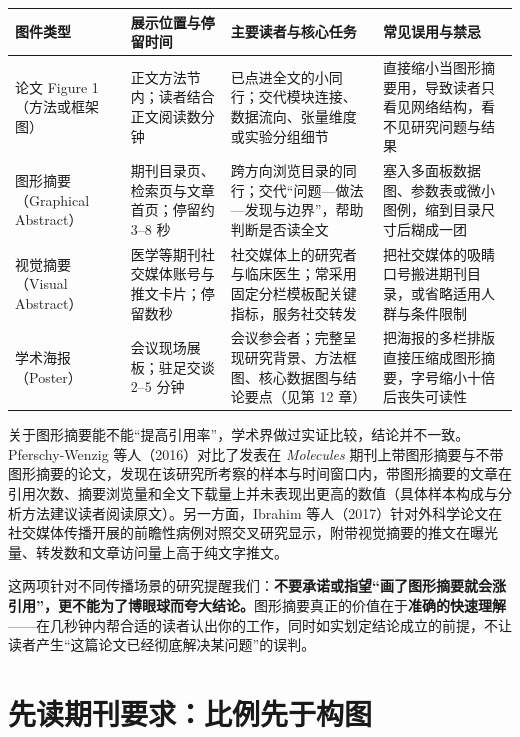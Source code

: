 \begin{center}\footnotesize
\setlength{\tabcolsep}{3pt}
\renewcommand{\arraystretch}{1.15}
\begin{tabularx}{\linewidth}{@{}>{\raggedright\arraybackslash}p{22mm}>{\raggedright\arraybackslash}p{24mm}YY@{}}
\toprule
\textbf{图件类型} & \textbf{展示位置与停留时间} & \textbf{主要读者与核心任务} & \textbf{常见误用与禁忌} \\
\midrule
论文 Figure 1（方法或框架图） & 正文方法节内；读者结合正文阅读数分钟 & 已点进全文的小同行；交代模块连接、数据流向、张量维度或实验分组细节 & 直接缩小当图形摘要用，导致读者只看见网络结构，看不见研究问题与结果 \\
图形摘要（Graphical Abstract） & 期刊目录页、检索页与文章首页；停留约 $3\text{--}8$ 秒 & 跨方向浏览目录的同行；交代“问题—做法—发现与边界”，帮助判断是否读全文 & 塞入多面板数据图、参数表或微小图例，缩到目录尺寸后糊成一团 \\
视觉摘要（Visual Abstract） & 医学等期刊社交媒体账号与推文卡片；停留数秒 & 社交媒体上的研究者与临床医生；常采用固定分栏模板配关键指标，服务社交转发 & 把社交媒体的吸睛口号搬进期刊目录，或省略适用人群与条件限制 \\
学术海报（Poster） & 会议现场展板；驻足交谈 $2\text{--}5$ 分钟 & 会议参会者；完整呈现研究背景、方法框图、核心数据图与结论要点（见第 12 章） & 把海报的多栏排版直接压缩成图形摘要，字号缩小十倍后丧失可读性 \\
\bottomrule
\end{tabularx}
\end{center}

关于图形摘要能不能“提高引用率”，学术界做过实证比较，结论并不一致。Pferschy-Wenzig 等人（2016）对比了发表在 \textit{Molecules} 期刊上带图形摘要与不带图形摘要的论文，发现在该研究所考察的样本与时间窗口内，带图形摘要的文章在引用次数、摘要浏览量和全文下载量上并未表现出更高的数值（具体样本构成与分析方法建议读者阅读原文）。另一方面，Ibrahim 等人（2017）针对外科学论文在社交媒体传播开展的前瞻性病例对照交叉研究显示，附带视觉摘要的推文在曝光量、转发数和文章访问量上高于纯文字推文。

这两项针对不同传播场景的研究提醒我们：\textbf{不要承诺或指望“画了图形摘要就会涨引用”，更不能为了博眼球而夸大结论。}图形摘要真正的价值在于\textbf{准确的快速理解}——在几秒钟内帮合适的读者认出你的工作，同时如实划定结论成立的前提，不让读者产生“这篇论文已经彻底解决某问题”的误判。

\section{先读期刊要求：比例先于构图}

